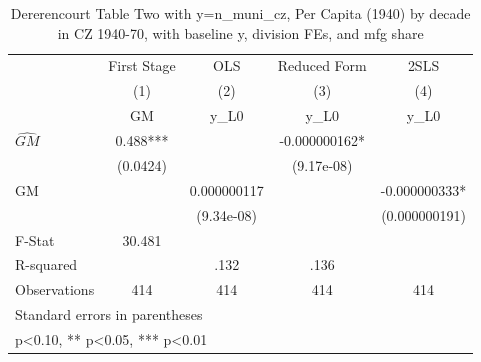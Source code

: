 \begin{table}[htbp]\centering
\def\sym#1{\ifmmode^{#1}\else\(^{#1}\)\fi}
\caption{Dererencourt Table Two with y=n\_muni\_cz, Per Capita (1940) by decade in CZ 1940-70, with baseline y, division FEs, and mfg share}
\begin{tabular}{l*{4}{c}}
\toprule
                    & First Stage   &         OLS   &Reduced Form   &        2SLS   \\
                    &\multicolumn{1}{c}{(1)}&\multicolumn{1}{c}{(2)}&\multicolumn{1}{c}{(3)}&\multicolumn{1}{c}{(4)}\\
                    &\multicolumn{1}{c}{GM}&\multicolumn{1}{c}{y\_L0}&\multicolumn{1}{c}{y\_L0}&\multicolumn{1}{c}{y\_L0}\\
\midrule
$\hat{GM}$          &       0.488***&               &-0.000000162*  &               \\
                    &    (0.0424)   &               &  (9.17e-08)   &               \\
\addlinespace
GM                  &               & 0.000000117   &               &-0.000000333*  \\
                    &               &  (9.34e-08)   &               &(0.000000191)   \\
\midrule
F-Stat              &      30.481   &               &               &               \\
R-squared           &               &        .132   &        .136   &               \\
Observations        &         414   &         414   &         414   &         414   \\
\bottomrule
\multicolumn{5}{l}{\footnotesize Standard errors in parentheses}\\
\multicolumn{5}{l}{\footnotesize * p<0.10, ** p<0.05, *** p<0.01}\\
\end{tabular}
\end{table}
